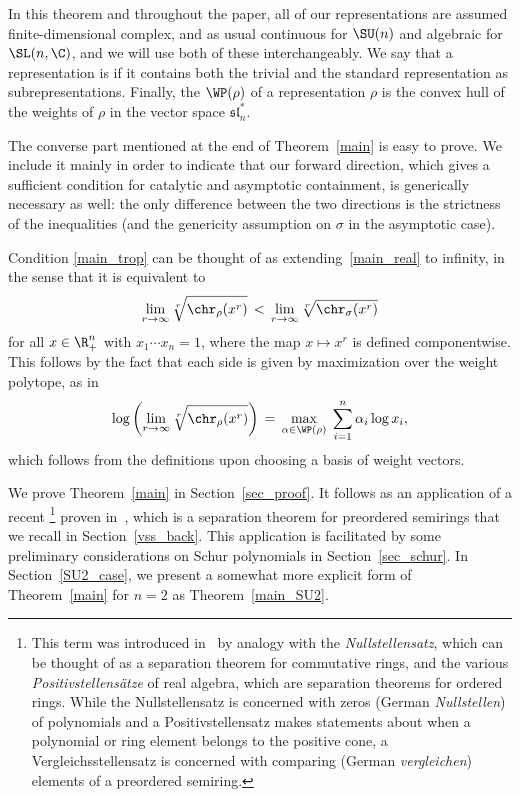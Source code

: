 In this theorem and throughout the paper, all of our representations are assumed finite-dimensional complex, and as usual continuous for $\SU(n)$ and algebraic for $\SL(n,\C)$, and we will use both of these interchangeably.
We say that a representation is  if it contains both the trivial and the standard representation as subrepresentations.
Finally, the  $\WP(\rho)$ of a representation $\rho$ is the convex hull of the weights of $\rho$ in the vector space $\mathfrak{sl}_n^*$.

\begin{rema}
	The converse part mentioned at the end of Theorem~\ref{main} is easy to prove. We include it mainly in order to indicate that our forward direction, which gives a sufficient condition for catalytic and asymptotic containment, is generically necessary as well: the only difference between the two directions is the strictness of the inequalities (and the genericity assumption on $\sigma$ in the asymptotic case).
\end{rema}

\begin{rema}
	Condition \ref{main_trop} can be thought of as extending~\ref{main_real} to infinity, in the sense that it is equivalent to
	\begin{equation}
		\label{main_trop_ineq2}
		\lim_{r \to \infty} \sqrt[r]{\chr_\rho(x^r)} \,<\, \lim_{r \to \infty} \sqrt[r]{\chr_\sigma(x^r)}
	\end{equation}
	for all $x \in \R_+^n$ with $x_1 \cdots x_n = 1$, where the map $x \mapsto x^r$ is defined componentwise.
	This follows by the fact that each side is given by maximization over the weight polytope, as in
	\[
		\log \left( \lim_{r \to \infty} \sqrt[r]{\chr_\rho(x^r)} \right) \,=\, \max_{\alpha \in \WP(\rho)} \; \sum_{i=1}^n \alpha_i \log x_i,
	\]
	which follows from the definitions upon choosing a basis of weight vectors.
\end{rema}

We prove Theorem~\ref{main} in Section~\ref{sec_proof}. 
It follows as an application of a recent \footnote{This term was introduced in~\cite{vergleichsstellensatz} by analogy with the \emph{Nullstellensatz}, which can be thought of as a separation theorem for commutative rings, and the various \emph{Positivstellens\"atze} of real algebra, which are separation theorems for ordered rings. While the Nullstellensatz is concerned with zeros (German \emph{Nullstellen}) of polynomials and a Positivstellensatz makes statements about when a polynomial or ring element belongs to the positive cone, a Vergleichsstellensatz is concerned with comparing (German \emph{vergleichen}) elements of a preordered semiring.} proven in~\cite{vergleichsstellensatz}, which is a separation theorem for preordered semirings that we recall in Section~\ref{vss_back}.
This application is facilitated by some preliminary considerations on Schur polynomials in Section~\ref{sec_schur}.
In Section~\ref{SU2_case}, we present a somewhat more explicit form of Theorem~\ref{main} for $n = 2$ as Theorem~\ref{main_SU2}.

